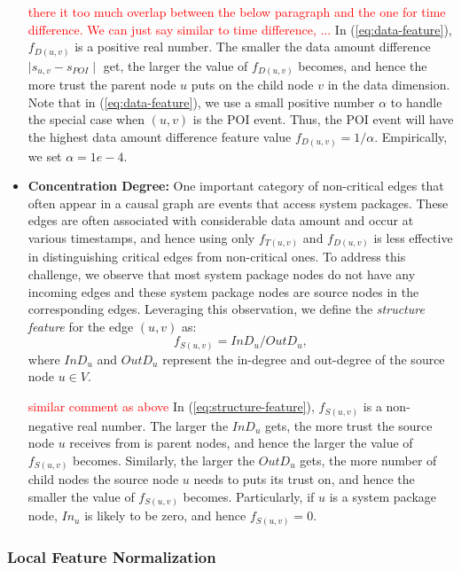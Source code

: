 \begin{itemize}[noitemsep, topsep=1pt, partopsep=1pt, listparindent=\parindent, leftmargin=*]
\textcolor{red}{there it too much overlap between the below paragraph and the one for time difference. We can just say similar to time difference, ...}
In (\ref{eq:data-feature}), $f_{D(u, v)}$ is a positive real number. The smaller the data amount difference $\mid s_{u, v} - s_{POI}\mid$ get, the larger the value of $f_{D(u, v)}$ becomes, and hence the more trust the parent node $u$ puts on the child node $v$ in the data dimension.
Note that in (\ref{eq:data-feature}), we use a small positive number $\alpha$ to handle the special case when $(u, v)$ is the POI event. Thus, the POI event will have the highest data amount difference feature value $f_{D(u, v)} = 1/\alpha$. Empirically, we set $\alpha = 1e-4$.


\item \textbf{Concentration Degree:}
One important category of non-critical edges that often appear in a causal graph are events that access system packages. These edges are often associated with considerable data amount and occur at various timestamps, and hence using only $f_{T(u, v)}$ and $f_{D(u, v)}$ is less effective in distinguishing critical edges from non-critical ones.
To address this challenge, we observe that most system package nodes do not have any incoming edges and these system package nodes are source nodes in the corresponding edges. Leveraging this observation, we define the \emph{structure feature} for the edge $(u, v)$ as:
\begin{equation}
    \label{eq:structure-feature}
    f_{S(u, v)} = InD_u/OutD_u,
\end{equation}
where $InD_u$ and $OutD_u$ represent the in-degree and out-degree of the source node $u\in V$.

\textcolor{red}{similar comment as above}
In (\ref{eq:structure-feature}), $f_{S(u, v)}$ is a non-negative real number. The larger the $InD_u$ gets, the more trust the source node $u$ receives from is parent nodes, and hence the larger the value of $f_{S(u, v)}$ becomes. Similarly, the larger the $OutD_u$ gets, the more number of child nodes the source node $u$ needs to puts its trust on, and hence the smaller the value of $f_{S(u, v)}$ becomes. Particularly, if $u$ is a system package node, $In_u$ is likely to be zero, and hence $f_{S(u, v)} = 0$. 

\end{itemize}




\subsubsection{Local Feature Normalization}
\label{subsubsec:feature-normalization}

